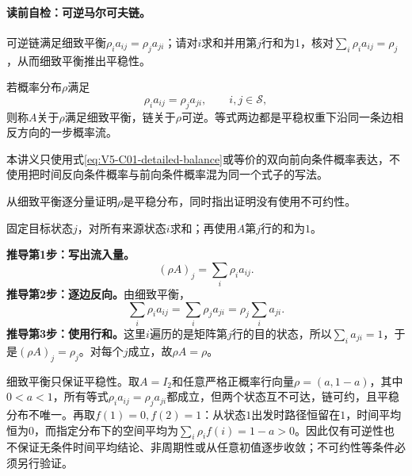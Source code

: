 \paragraph{读前自检：可逆马尔可夫链。}可逆链满足细致平衡$\rho_i a_{ij}=\rho_j a_{ji}$；请对$i$求和并用第$j$行和为1，核对$\sum_i\rho_i a_{ij}=\rho_j$，从而细致平衡推出平稳性。\par

\begin{definition}[细致平衡与可逆性]
若概率分布$\rho$满足
\begin{equation}\label{eq:V5-C01-detailed-balance}
\rho_i a_{ij}=\rho_j a_{ji},\qquad i,j\in\mathcal S,
\end{equation}
则称$A$关于$\rho$满足细致平衡，链关于$\rho$可逆。等式两边都是平稳权重下沿同一条边相反方向的一步概率流。
\end{definition}
本讲义只使用式\eqref{eq:V5-C01-detailed-balance}或等价的双向前向条件概率表达，不使用把时间反向条件概率与前向条件概率混为同一个式子的写法。


\begin{derivationgoalbox}
从细致平衡逐分量证明$\rho$是平稳分布，同时指出证明没有使用不可约性。
\end{derivationgoalbox}
\begin{derivationprepbox}
固定目标状态$j$，对所有来源状态$i$求和；再使用$A$第$j$行的和为$1$。
\end{derivationprepbox}
\textbf{推导第1步：写出流入量。}
\[
(\rho A)_j=\sum_i\rho_i a_{ij}.
\]
\textbf{推导第2步：逐边反向。}由细致平衡，
\[
\sum_i\rho_i a_{ij}=\sum_i\rho_j a_{ji}
=\rho_j\sum_i a_{ji}.
\]
\textbf{推导第3步：使用行和。}这里$i$遍历的是矩阵第$j$行的目的状态，所以$\sum_i a_{ji}=1$，于是$(\rho A)_j=\rho_j$。对每个$j$成立，故$\rho A=\rho$。

\begin{warningbox}
细致平衡只保证平稳性。取$A=I_2$和任意严格正概率行向量$\rho=(a,1-a)$，其中$0<a<1$，所有等式$\rho_i a_{ij}=\rho_j a_{ji}$都成立，但两个状态互不可达，链可约，且平稳分布不唯一。再取$f(1)=0,f(2)=1$：从状态$1$出发时路径恒留在$1$，时间平均恒为$0$，而指定分布下的空间平均为$\sum_i\rho_i f(i)=1-a>0$。因此仅有可逆性也不保证无条件时间平均结论、非周期性或从任意初值逐步收敛；不可约性等条件必须另行验证。
\end{warningbox}

